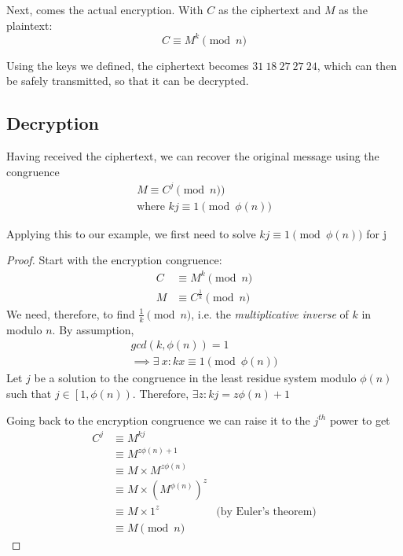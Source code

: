 \documentclass[12pt]{article}
\begin{document}
    Next, comes the actual encryption. With $C$ as the ciphertext and $M$ as the plaintext:
    \begin{equation*}
        C \equiv M^{k} \pmod{n}
    \end{equation*}

    Using the keys we defined, the ciphertext becomes $31\ 18\ 27\ 27\ 24$, which can then be safely
    transmitted, so that it can be decrypted.

    \subsection{Decryption}
    Having received the ciphertext, we can recover the original message using the congruence
    \begin{align*}
        M \equiv C^j \pmod{n})\\
        \text{where } kj \equiv 1 \pmod{\phi (n)}
    \end{align*}

    Applying this to our example, we first need to solve $kj \equiv 1 \pmod{\phi (n)}$ for j

    \begin{proof}
        Start with the encryption congruence: 
        \begin{align*}
            C & \equiv M^{k} \pmod{n}\\
            M & \equiv C^{\frac{1}{k}} \pmod{n}
        \end{align*}
        We need, therefore, to find $\frac{1}{k} \pmod{n}$, i.e. the \emph{multiplicative inverse}
        of $k$ in modulo $n$. By assumption, 
        \begin{align*}
            gcd(k, \phi (n)) = 1 \\
            \implies \exists\ x: kx \equiv 1 \pmod{\phi (n)}
        \end{align*}
        Let $j$ be a solution to the congruence in the least residue system modulo $\phi (n)$ such that 
        $j \in \left[1, \phi (n) \right)$. Therefore, $\exists z: kj = z\phi (n) + 1$

        Going back to the encryption congruence we can raise it to the $j^{th}$ power to get
        \begin{align*}
            C^j & \equiv M^{kj}\\ 
                & \equiv M^{z\phi (n) + 1}\\
                & \equiv M\times M^{z \phi(n)}\\
                & \equiv M\times (M^{\phi (n)})^z\\
                & \equiv M\times 1^z                &\text{(by Euler's theorem)}\\
                & \equiv M \pmod{n}
        \end{align*}
    \end{proof}
\end{document}
